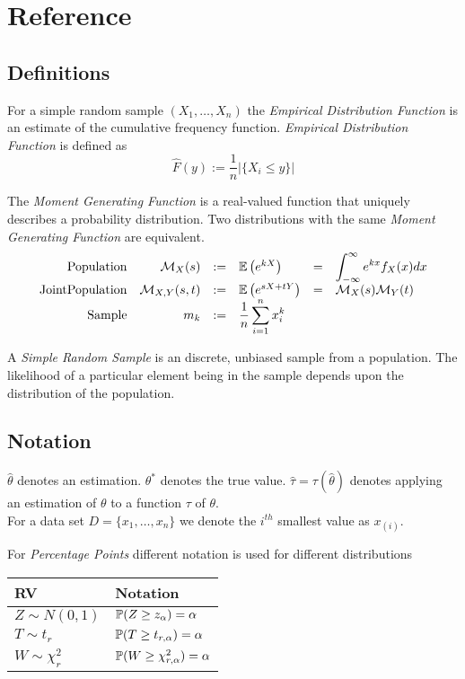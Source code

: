 \documentclass[11pt,a4paper]{article}
\begin{document}
\section{Reference}

\subsection{Definitions}

For a simple random sample $(X_1,\dots,X_n)$ the \textit{Empirical Distribution Function} is an estimate of the cumulative frequency function. \textit{Empirical Distribution Function} is defined as
$$\hat{F}(y):=\frac{1}{n}\left|\{X_i\leq y\}\right|$$

The \textit{Moment Generating Function} is a real-valued function that uniquely describes a probability distribution. Two distributions with the same \textit{Moment Generating Function} are equivalent.
\[\begin{array}{rrclcl}
\mathrm{Population}&\mathcal{M}_X(s)&:=&\mathbb{E}\left(e^{kX}\right)&=&\displaystyle{\int_{-\infty}^\infty e^{kx}f_X(x)dx}\\
\mathrm{Joint Population}&\mathcal{M}_{X,Y}(s,t)&:=&\mathbb{E}\left(e^{sX+tY}\right)&=&\mathcal{M}_X(s)\mathcal{M}_Y(t)\\
\mathrm{Sample}&m_k&:=&\displaystyle{\frac{1}{n}\sum_{i=1}^nx_i^k}
\end{array}\]

A \textit{Simple Random Sample} is an discrete, unbiased sample from a population. The likelihood of a particular element being in the sample depends upon the distribution of the population.


\subsection{Notation}

$\hat{\theta}$ denotes an estimation. $\theta^*$ denotes the true value. $\hat{\tau}=\tau(\hat{\theta})$ denotes applying an estimation of $\theta$ to a function $\tau$ of $\theta$.\\

For a data set $D=\{x_1,\dots,x_n\}$ we denote the $i^{th}$ smallest value as $x_{(i)}$.

For \textit{Percentage Points} different notation is used for different distributions\\
\begin{tabular}{|l|l|}
\hline
RV&Notation\\
\hline
$Z\sim N(0,1)$&$\mathbb{P}(Z\geq z_\alpha)=\alpha$\\
$T\sim  t_r$&$\mathbb{P}(T\geq t_{r,\alpha})=\alpha$\\
$W\sim  \chi^2_r$&$\mathbb{P}(W\geq \chi^2_{r,\alpha})=\alpha$\\
\hline
\end{tabular}\\
\end{document}
